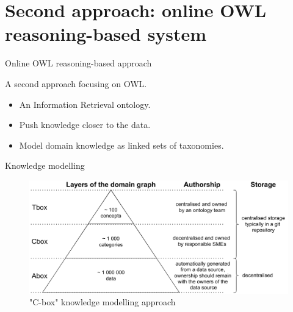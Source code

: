 \section{Second approach: online OWL reasoning-based system}

\begin{frame}{Online OWL reasoning-based approach}

    A second approach focusing on OWL.
    
    \begin{itemize}
        \item An Information Retrieval ontology.
        \item Push knowledge closer to the data.
        \item Model domain knowledge as linked sets of taxonomies. 
    \end{itemize}

\end{frame}

\begin{frame}{Knowledge modelling}

    \begin{figure} [H]
        \begin{center}
            \includegraphics[scale=0.5]{images/TboxAboxCboxLayers.pdf} 
            \caption{"C-box" knowledge modelling approach} 
        \end{center}
    \end{figure}

\end{frame}

